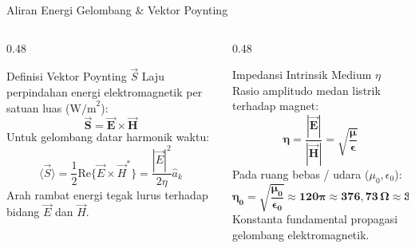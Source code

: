 \documentclass[aspectratio=169,10pt]{beamer}
\begin{document}
\begin{frame}{Aliran Energi Gelombang \& Vektor Poynting}
  \begin{columns}[t]
    \begin{column}{0.48\textwidth}
      \begin{block}{Definisi Vektor Poynting $\vec{S}$}
        \small
        Laju perpindahan energi elektromagnetik per satuan luas ($\text{W/m}^2$):
        \begin{equation*}
          \mathbf{\vec{S} = \vec{E} \times \vec{H}}
        \end{equation*}
        Untuk gelombang datar harmonik waktu:
        \begin{equation*}
          \langle \vec{S} \rangle = \frac{1}{2} \text{Re}\{\vec{E} \times \vec{H}^*\} = \frac{|\vec{E}|^2}{2\eta} \hat{a}_k
        \end{equation*}
        Arah rambat energi tegak lurus terhadap bidang $\vec{E}$ dan $\vec{H}$.
      \end{block}
    \end{column}
    \begin{column}{0.48\textwidth}
      \begin{alertblock}{Impedansi Intrinsik Medium $\eta$}
        \small
        Rasio amplitudo medan listrik terhadap magnet:
        \begin{equation*}
          \mathbf{\eta = \frac{|\vec{E}|}{|\vec{H}|} = \sqrt{\frac{\mu}{\epsilon}}}
        \end{equation*}
        Pada ruang bebas / udara ($\mu_0, \epsilon_0$):
        \begin{equation*}
          \mathbf{\eta_0 = \sqrt{\frac{\mu_0}{\epsilon_0}} \approx 120\pi \approx 376{,}73\,\Omega \approx 377\,\Omega}
        \end{equation*}
        Konstanta fundamental propagasi gelombang elektromagnetik.
      \end{alertblock}
    \end{column}
  \end{columns}
\end{frame}
\end{document}
